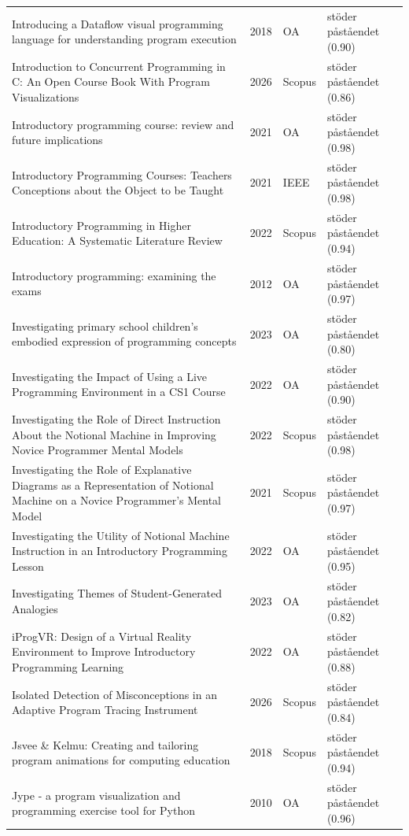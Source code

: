 \begin{longtable}{@{}%
  >{\raggedright\arraybackslash}p{}c%
  >{\raggedright\arraybackslash}p{}%
  >{\raggedright\arraybackslash}p{}@{}}
Introducing a Dataflow visual programming language for understanding program execution & 2018 & OA & stöder påståendet (0.90) \\
Introduction to Concurrent Programming in C: An Open Course Book With Program Visualizations & 2026 & Scopus & stöder påståendet (0.86) \\
Introductory programming course: review and future implications & 2021 & OA & stöder påståendet (0.98) \\
Introductory Programming Courses: Teachers Conceptions about the Object to be Taught & 2021 & IEEE & stöder påståendet (0.98) \\
Introductory Programming in Higher Education: A Systematic Literature Review & 2022 & Scopus & stöder påståendet (0.94) \\
Introductory programming: examining the exams & 2012 & OA & stöder påståendet (0.97) \\
Investigating primary school children's embodied expression of programming concepts & 2023 & OA & stöder påståendet (0.80) \\
Investigating the Impact of Using a Live Programming Environment in a CS1 Course & 2022 & OA & stöder påståendet (0.90) \\
Investigating the Role of Direct Instruction About the Notional Machine in Improving Novice Programmer Mental Models & 2022 & Scopus & stöder påståendet (0.98) \\
Investigating the Role of Explanative Diagrams as a Representation of Notional Machine on a Novice Programmer's Mental Model & 2021 & Scopus & stöder påståendet (0.97) \\
Investigating the Utility of Notional Machine Instruction in an Introductory Programming Lesson & 2022 & OA & stöder påståendet (0.95) \\
Investigating Themes of Student-Generated Analogies & 2023 & OA & stöder påståendet (0.82) \\
iProgVR: Design of a Virtual Reality Environment to Improve Introductory Programming Learning & 2022 & OA & stöder påståendet (0.88) \\
Isolated Detection of Misconceptions in an Adaptive Program Tracing Instrument & 2026 & Scopus & stöder påståendet (0.84) \\
Jsvee \& Kelmu: Creating and tailoring program animations for computing education & 2018 & Scopus & stöder påståendet (0.94) \\
Jype - a program visualization and programming exercise tool for Python & 2010 & OA & stöder påståendet (0.96) \\

\end{longtable}
